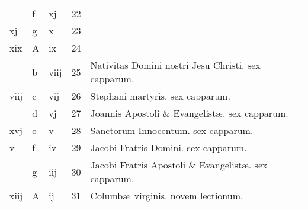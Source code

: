 \documentclass[letter,11pt]{book}
\begin{document}
\begin{center}
\begin{tabular}{l | l | l | r | l}
\color{Red}  & f & \color{Red} xj & 22 & \\
\color{Red} xj & g & \color{Red} x & 23 & \\
\color{Red} xix & \color{Red} A & \color{Red} ix & 24 & \\
\color{Red}  & b & \color{Red} viij & 25 & \color{Red} Nativitas Domini nostri Jesu Christi. \color{black} sex capparum. \\
\color{Red} viij & c & \color{Red} vij & 26 & \color{Red} Stephani martyris. \color{black} sex capparum. \\
\color{Red}  & d & \color{Red} vj & 27 & \color{Red} Joannis Apostoli \& Evangelist\ae . \color{black} sex capparum. \\
\color{Red} xvj & e & \color{Red} v & 28 & \color{Red} Sanctorum Innocentum. \color{black} sex capparum. \\
\color{Red} v & f & \color{Red} iv & 29 & Jacobi Fratris Domini. \color{Red} sex capparum. \\
\color{Red}  & g & \color{Red} iij & 30 & Jacobi Fratris Apostoli \& Evangelist\ae . \color{Red} sex capparum. \\
\color{Red} xiij & \color{Red} A & \color{Red} ij & 31 & Columb\ae \ virginis. \color{Red} novem lectionum. \\
\end{tabular}
\end{center}
\end{document}

